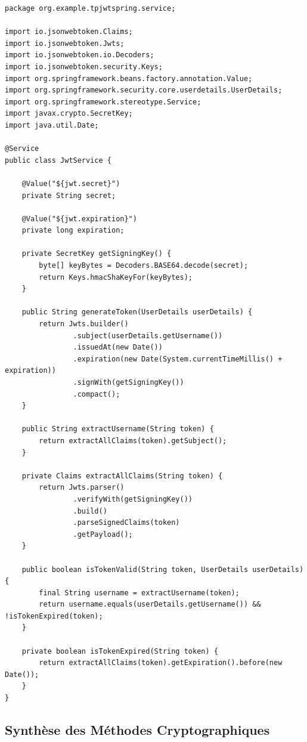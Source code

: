 \documentclass{rapportFSR}
\begin{document}
\begin{lstlisting}[style=java, caption={Service de gestion des tokens (src/.../service/JwtService.java)}]
package org.example.tpjwtspring.service;

import io.jsonwebtoken.Claims;
import io.jsonwebtoken.Jwts;
import io.jsonwebtoken.io.Decoders;
import io.jsonwebtoken.security.Keys;
import org.springframework.beans.factory.annotation.Value;
import org.springframework.security.core.userdetails.UserDetails;
import org.springframework.stereotype.Service;
import javax.crypto.SecretKey;
import java.util.Date;

@Service
public class JwtService {

    @Value("${jwt.secret}")
    private String secret;

    @Value("${jwt.expiration}")
    private long expiration;

    private SecretKey getSigningKey() {
        byte[] keyBytes = Decoders.BASE64.decode(secret);
        return Keys.hmacShaKeyFor(keyBytes);
    }

    public String generateToken(UserDetails userDetails) {
        return Jwts.builder()
                .subject(userDetails.getUsername())
                .issuedAt(new Date())
                .expiration(new Date(System.currentTimeMillis() + expiration))
                .signWith(getSigningKey())
                .compact();
    }

    public String extractUsername(String token) {
        return extractAllClaims(token).getSubject();
    }

    private Claims extractAllClaims(String token) {
        return Jwts.parser()
                .verifyWith(getSigningKey())
                .build()
                .parseSignedClaims(token)
                .getPayload();
    }

    public boolean isTokenValid(String token, UserDetails userDetails) {
        final String username = extractUsername(token);
        return username.equals(userDetails.getUsername()) && !isTokenExpired(token);
    }

    private boolean isTokenExpired(String token) {
        return extractAllClaims(token).getExpiration().before(new Date());
    }
}
\end{lstlisting}

\subsection{Synthèse des Méthodes Cryptographiques}
\end{document}
